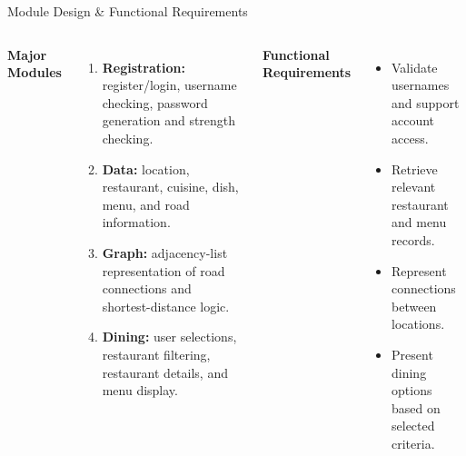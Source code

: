 \documentclass[aspectratio=169,10pt]{beamer}
\begin{document}
\begin{frame}{Module Design \& Functional Requirements}
\small
\begin{columns}[T,totalwidth=\textwidth]
\textbf{\color{GEUBlue}Major Modules}
\begin{enumerate}\itemsep4pt
\item \textbf{Registration:} register/login, username checking, password generation and strength checking.
\item \textbf{Data:} location, restaurant, cuisine, dish, menu, and road information.
\item \textbf{Graph:} adjacency-list representation of road connections and shortest-distance logic.
\item \textbf{Dining:} user selections, restaurant filtering, restaurant details, and menu display.
\end{enumerate}
\textbf{\color{GEUBlue}Functional Requirements}
\begin{itemize}\itemsep4pt
\item Validate usernames and support account access.
\item Retrieve relevant restaurant and menu records.
\item Represent connections between locations.
\item Present dining options based on selected criteria.
\end{itemize}
\end{columns}

\end{frame}
\end{document}
